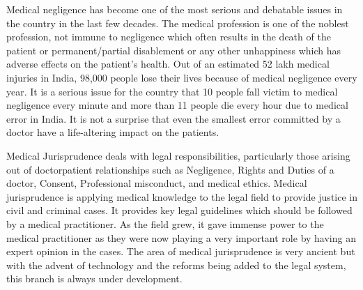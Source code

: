 \setcounter{figure}{0}
\setcounter{table}{0}
\setcounter{footnote}{0}


\begin{multicols}{2}


\vspace{-.1cm}

\noi
Medical negligence has become one of the most serious and debatable issues in the country in the
last few decades. The medical profession is one of the noblest profession, not immune to
negligence which often results in the death of the patient or permanent/partial disablement or any
other unhappiness which has adverse effects on the patient’s health. Out of an estimated 52 lakh
medical injuries in India, 98,000 people lose their lives because of medical negligence every year.
It is a serious issue for the country that 10 people fall victim to medical negligence every minute
and more than 11 people die every hour due to medical error in India. It is not a surprise that even
the smallest error committed by a doctor have a life-altering impact on the patients.

\vspace{-.1cm}

\noi
Medical Jurisprudence deals with legal responsibilities, particularly those arising out of doctorpatient relationships such as Negligence, Rights and Duties of a doctor, Consent, Professional
misconduct, and medical ethics. Medical jurisprudence is applying medical knowledge to the
legal field to provide justice in civil and criminal cases. It provides key legal guidelines which
should be followed by a medical practitioner. As the field grew, it gave immense power to the
medical practitioner as they were now playing a very important role by having an expert opinion
in the cases. The area of medical jurisprudence is very ancient but with the advent of technology
and the reforms being added to the legal system, this branch is always under development.

\vspace{-.1cm}


\end{multicols}
